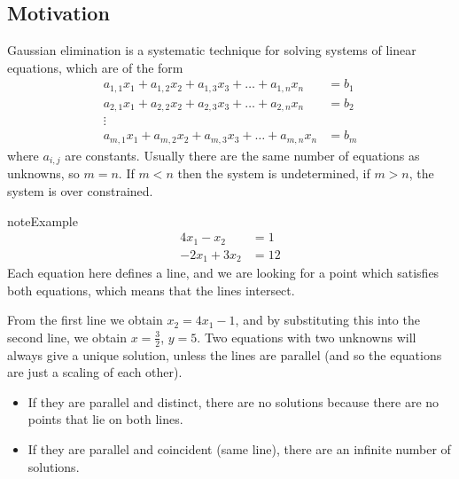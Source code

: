 \documentclass[letterpaper,10pt,english]{jupyterBook}
\begin{document}
\subsection{Motivation}
\label{\detokenize{LinearAlgebra/linear_systems_matrices/echelon_form:motivation}}
\sphinxAtStartPar
Gaussian elimination is a systematic technique for solving systems of linear equations, which are of the form
\label{equation:LinearAlgebra/linear_systems_matrices/echelon_form:879189c2-8cf6-4479-ad48-c1c6f29dc91b}\begin{align}
a_{1,1} x_1 + a_{1,2} x_2 + a_{1,3} x_3 + \dots + a_{1,n} x_n &= b_1 \\

   a_{2,1} x_1 + a_{2,2} x_2 + a_{2,3} x_3 + \dots + a_{2,n} x_n &= b_2\\
                                                                     \vdots \\
 a_{m,1} x_1 + a_{m,2} x_2 + a_{m,3} x_3 + \dots + a_{m,n} x_n &= b_m
\end{align}
\sphinxAtStartPar
where \(a_{i,j}\) are constants. Usually there are the same number of equations as unknowns, so \(m = n\).  If \(m < n\) then the system is undetermined, if \(m > n\), the system is over constrained.

\begin{sphinxadmonition}{note}{Example}
\label{equation:LinearAlgebra/linear_systems_matrices/echelon_form:b7022e4f-dff8-4271-ac52-b86ef30209c4}\begin{align}4 x_1 - x_2 &= 1\\ -2 x_1 + 3 x_2 &= 12 \end{align}
\sphinxAtStartPar
Each equation here defines a line, and we are looking for a point which satisfies both equations, which means that the lines intersect.

\sphinxAtStartPar
From the first line we obtain \(x_2 = 4 x_1 - 1\), and by substituting this into the second line, we obtain \(x = \frac{3}{2}\), \(y = 5\). Two equations with two unknowns will always give a unique solution, unless the lines are parallel (and so the equations are just a scaling of each other).
\begin{itemize}
\item {} 
\sphinxAtStartPar
If they are parallel and distinct, there are no solutions because there are no points that lie on both lines.

\item {} 
\sphinxAtStartPar
If they are parallel and coincident (same line), there are an infinite number of solutions.

\end{itemize}
\end{sphinxadmonition}
\end{document}
